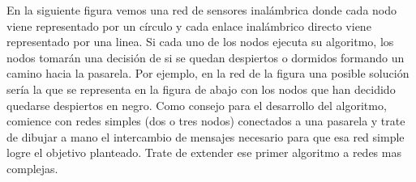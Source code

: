 En la siguiente figura vemos una red de sensores inalámbrica donde cada nodo viene representado por un círculo y cada enlace inalámbrico directo viene representado por una linea. Si cada uno de los nodos  ejecuta su algoritmo, los nodos tomarán una decisión de si se quedan despiertos o dormidos formando un camino hacia la pasarela. Por ejemplo, en la red de la figura una posible solución sería la que se representa en la figura de abajo con los nodos que han decidido quedarse despiertos en negro.
Como consejo para el desarrollo del algoritmo, comience con redes simples (dos o tres nodos) conectados a una pasarela y trate de dibujar a mano el intercambio de mensajes necesario para que esa red simple logre el objetivo planteado. Trate de extender ese primer algoritmo a redes mas complejas.


